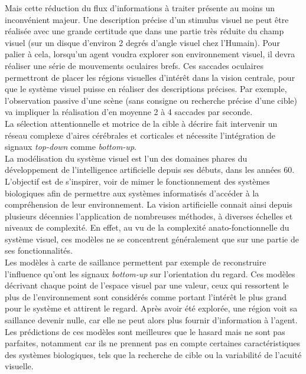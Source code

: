 Mais cette réduction du flux d'informations à traiter présente au moins un inconvénient majeur. 
Une description précise d'un stimulus visuel ne peut être réalisée avec une grande certitude que dans une partie très réduite du champ visuel (sur un disque d'environ 2 degrés d'angle visuel chez l'Humain).
Pour palier à cela, lorsqu'un agent voudra explorer son environnement visuel, il devra réaliser une série de mouvements oculaires brefs. Ces saccades oculaires permettront de placer les régions visuelles d'intérêt dans la vision centrale, pour que le système visuel puisse en réaliser des descriptions précises. Par exemple, l'observation passive d'une scène (sans consigne ou recherche précise d'une cible) va impliquer la réalisation d'en moyenne 2 à 4 saccades par seconde. \autocite{Krauzlis2017, Werner2014} \\
La sélection attentionnelle et motrice de la cible à décrire fait intervenir un réseau complexe d'aires cérébrales et corticales et nécessite l'intégration de signaux \textit{top-down} comme \textit{bottom-up}. \autocite{Werner2014} \\


La modélisation du système visuel est l'un des domaines phares du développement de l'intelligence artificielle depuis ses débuts, dans les années 60.
L'objectif est de s'inspirer, voir de mimer le fonctionnement des systèmes biologiques afin de permettre aux systèmes informatisés d'accéder à la compréhension de leur environnement.
La vision artificielle connait ainsi depuis plusieurs décennies l'application de nombreuses méthodes, à diverses échelles et niveaux de complexité.
En effet, au vu de la complexité anato-fonctionnelle du système visuel, ces modèles ne se concentrent généralement que sur une partie de ses fonctionnalités. \autocite{Werner2014, Zhaoping2014} \\
Les modèles à carte de saillance permettent par exemple de reconstruire l'influence qu'ont les signaux \textit{bottom-up} sur l'orientation du regard. 
Ces modèles décrivant chaque point de l'espace visuel par une valeur, ceux qui ressortent le plus de l'environnement sont considérés comme portant l'intérêt le plus grand pour le système et attirent le regard. 
Après avoir été explorée, une région voit sa saillance devenir nulle, car elle ne peut alors plus fournir d'information à l'agent.
Les prédictions de ces modèles sont meilleures que le hasard mais ne sont pas parfaites, notamment car ils ne prennent pas en compte certaines caractéristiques des systèmes biologiques, tels que la recherche de cible ou la variabilité de l'acuité visuelle. \autocite{Werner2014, Zhaoping2014} \\

